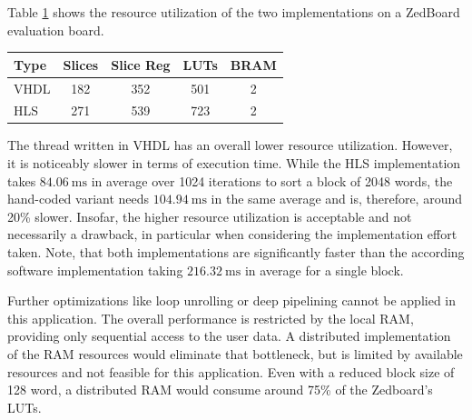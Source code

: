 Table \ref{tab:hls_util} shows the resource utilization of the two
implementations on a ZedBoard evaluation board.
\begin{table}
	\scriptsize
	\centering
	\label{tab:hls_util}
	\begin{tabular}{lcccc}
	\hline
	\textbf{Type} & \textbf{Slices} & \textbf{Slice Reg} & \textbf{LUTs} & \textbf{BRAM}\\
	\hline
	\ac{VHDL} & 182 & 352 & 501 & 2\\
	\ac{HLS} & 271 & 539 & 723 & 2\\
	\hline
	\end{tabular}
\end{table}
The thread written in \ac{VHDL} has an overall lower resource utilization.
However, it is noticeably slower in terms of execution time. While the
\ac{HLS} implementation takes $\SI{84.06}{\milli\second}$ in average over 1024
iterations to sort a block of 2048 words, the hand-coded variant needs
$\SI{104.94}{\milli\second}$ in the same average and is, therefore, around
20\% slower. Insofar, the higher resource utilization is acceptable and not
necessarily a drawback, in particular when considering the implementation
effort taken. Note, that both implementations are significantly faster than
the according software implementation taking $\SI{216.32}{\milli\second}$ in
average for a single block.

Further optimizations like loop unrolling or deep pipelining cannot be applied
in this application. The overall performance is restricted by the local
\ac{RAM}, providing only sequential access to the user data. A distributed
implementation of the \ac{RAM} resources would eliminate that bottleneck, but
is limited by available resources and not feasible for this application. Even
with a reduced block size of 128 word, a distributed \ac{RAM} would consume
around 75\% of the Zedboard's \acp{LUT}.